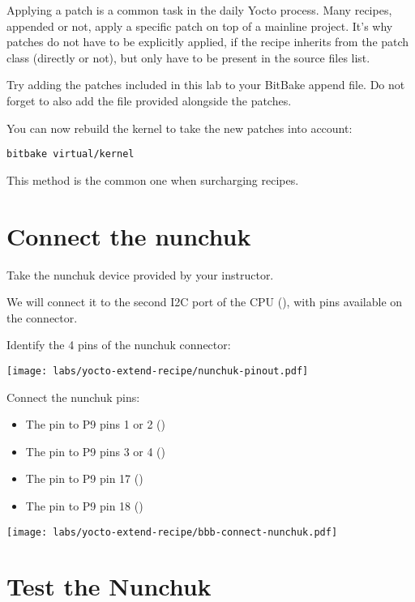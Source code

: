 Applying a patch is a common task in the daily Yocto process. Many recipes,
appended or not, apply a specific patch on top of a mainline project. It's why
patches do not have to be explicitly applied, if the recipe inherits from the
patch class (directly or not), but only have to be present in the source files
list.

Try adding the patches included in this lab to your BitBake append
file. Do not forget to also add the  file provided
alongside the patches.

You can now rebuild the  kernel to take the new
patches into account:
\begin{verbatim}
bitbake virtual/kernel
\end{verbatim}

This method is the common one when surcharging recipes.

\section{Connect the nunchuk}

Take the nunchuk device provided by your instructor.

We will connect it to the second I2C port of the CPU (),
with pins available on the  connector.

Identify the 4 pins of the nunchuk connector:

\begin{center}
\texttt{[image: labs/yocto-extend-recipe/nunchuk-pinout.pdf]}
\end{center}

Connect the nunchuk pins:
\begin{itemize}
\item The  pin to P9 pins 1 or 2 ()
\item The  pin to P9 pins 3 or 4 ()
\item The  pin to P9 pin 17 ()
\item The  pin to P9 pin 18 ()
\end{itemize}

\begin{center}
\texttt{[image: labs/yocto-extend-recipe/bbb-connect-nunchuk.pdf]}
\end{center}

\section{Test the Nunchuk}

